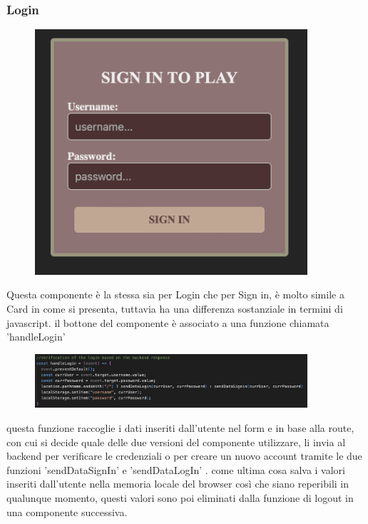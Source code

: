 \documentclass{article}
\begin{document}
\subsubsection{Login}
\begin{figure}[H]
    \centering
    \includegraphics[width=0.9\textwidth]{images/sign_in.png}
\end{figure}
Questa componente è la stessa sia per Login che per Sign in, è molto simile a Card in come si presenta,
tuttavia ha una differenza sostanziale in termini di javascript. il bottone del componente è associato a una funzione chiamata 'handleLogin'

\begin{figure}[H]
    \centering
    \includegraphics[width=0.9\textwidth]{images/handleLogin.png}
\end{figure}
questa funzione raccoglie i dati inseriti dall'utente nel form e in base alla route, con cui si decide quale delle due versioni del componente utilizzare,
li invia al backend per verificare le credenziali o per creare un nuovo account tramite le due funzioni 'sendDataSignIn' e 'sendDataLogIn' .
come ultima cosa salva i valori inseriti dall'utente nella memoria locale del browser così che siano reperibili in qualunque momento, questi valori sono poi eliminati
dalla funzione di logout in una componente successiva.
\end{document}
